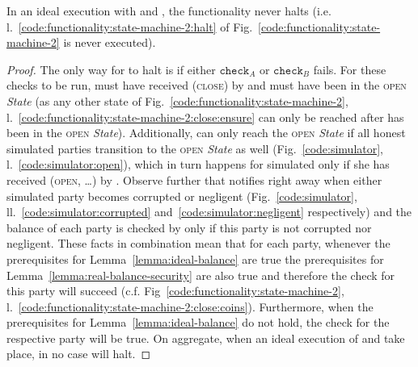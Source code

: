 \begin{lemma}[No halt]
  In an ideal execution with \fchan and \simulator, the functionality never
  halts (i.e. l.~\ref{code:functionality:state-machine-2:halt} of
  Fig.~\ref{code:functionality:state-machine-2} is never executed).
\end{lemma}

\begin{proof}
  The only way for \fchan to halt is if either $\texttt{check}_A$ or
  $\texttt{check}_B$ fails. For these checks to be run, \fchan must have
  received (\textsc{close}) by \simulator and must have been in the
  \textsc{open} \textit{State} (as any other state of
  Fig.~\ref{code:functionality:state-machine-2},
  l.~\ref{code:functionality:state-machine-2:close:ensure} can only be reached
  after \fchan has been in the \textsc{open} \textit{State}). Additionally,
  \fchan can only reach the \textsc{open} \textit{State} if all honest simulated
  parties transition to the \textsc{open} \textit{State} as well
  (Fig.~\ref{code:simulator}, l.~\ref{code:simulator:open}), which in turn
  happens for simulated \alice only if she has received (\textsc{open}, \dots)
  by \environment. Observe further that \simulator notifies \fchan right away
  when either simulated party becomes corrupted or negligent
  (Fig.~\ref{code:simulator}, ll.~\ref{code:simulator:corrupted}
  and~\ref{code:simulator:negligent} respectively) and the balance of each party
  is checked by \fchan only if this party is not corrupted nor negligent. These
  facts in combination mean that for each party, whenever the prerequisites for
  Lemma~\ref{lemma:ideal-balance} are true the prerequisites for
  Lemma~\ref{lemma:real-balance-security} are also true and therefore the check
  for this party will succeed (c.f.
  Fig~\ref{code:functionality:state-machine-2},
  l.~\ref{code:functionality:state-machine-2:close:coins}). Furthermore, when
  the prerequisites for Lemma~\ref{lemma:ideal-balance} do not hold, the check
  for the respective party will be true. On aggregate, when an ideal execution
  of \fchan and \simulator take place, in no case will \fchan halt.
\end{proof}
